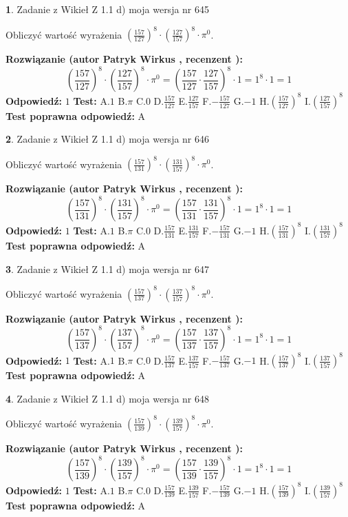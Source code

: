 \documentclass[12pt, a4paper]{article}
\theoremstyle{definition} %
\newtheorem{zad}{}
\newcommand{\zadStart}[1]{\begin{zad}#1\newline}
\newcommand{\zadStop}{\end{zad}}
\newcommand{\rozwStart}[2]{\noindent \textbf{Rozwiązanie (autor #1 , recenzent #2): }\newline}
\newcommand{\rozwStop}{\newline}
\newcommand{\odpStart}{\noindent \textbf{Odpowiedź:}\newline}
\newcommand{\odpStop}{\newline}
\newcommand{\testStart}{\noindent \textbf{Test:}\newline}
\newcommand{\testStop}{\newline}
\newcommand{\kluczStart}{\noindent \textbf{Test poprawna odpowiedź:}\newline}
\newcommand{\kluczStop}{\newline}
\begin{document}
\zadStart{Zadanie z Wikieł Z 1.1 d) moja wersja nr 645}

Obliczyć wartość wyrażenia $(\frac{157}{127})^{8} \cdot (\frac{127}{157})^{8} \cdot \pi^{0}$.
\zadStop
\rozwStart{Patryk Wirkus}{}
$$(\frac{157}{127})^{8} \cdot (\frac{127}{157})^{8} \cdot \pi^{0} = (\frac{157}{127} \cdot \frac{127}{157})^{8} \cdot 1 = 1^{8} \cdot 1 = 1$$
\rozwStop
\odpStart
$1$
\odpStop
\testStart
A.$1$ B.$\pi$ C.$0$ D.$\frac{157}{127}$ E.$\frac{127}{157}$
F.$-\frac{157}{127}$ G.$-1$
H.$(\frac{157}{127})^{8}$
I.$(\frac{127}{157})^{8}$
\testStop
\kluczStart
A
\kluczStop



\zadStart{Zadanie z Wikieł Z 1.1 d) moja wersja nr 646}

Obliczyć wartość wyrażenia $(\frac{157}{131})^{8} \cdot (\frac{131}{157})^{8} \cdot \pi^{0}$.
\zadStop
\rozwStart{Patryk Wirkus}{}
$$(\frac{157}{131})^{8} \cdot (\frac{131}{157})^{8} \cdot \pi^{0} = (\frac{157}{131} \cdot \frac{131}{157})^{8} \cdot 1 = 1^{8} \cdot 1 = 1$$
\rozwStop
\odpStart
$1$
\odpStop
\testStart
A.$1$ B.$\pi$ C.$0$ D.$\frac{157}{131}$ E.$\frac{131}{157}$
F.$-\frac{157}{131}$ G.$-1$
H.$(\frac{157}{131})^{8}$
I.$(\frac{131}{157})^{8}$
\testStop
\kluczStart
A
\kluczStop



\zadStart{Zadanie z Wikieł Z 1.1 d) moja wersja nr 647}

Obliczyć wartość wyrażenia $(\frac{157}{137})^{8} \cdot (\frac{137}{157})^{8} \cdot \pi^{0}$.
\zadStop
\rozwStart{Patryk Wirkus}{}
$$(\frac{157}{137})^{8} \cdot (\frac{137}{157})^{8} \cdot \pi^{0} = (\frac{157}{137} \cdot \frac{137}{157})^{8} \cdot 1 = 1^{8} \cdot 1 = 1$$
\rozwStop
\odpStart
$1$
\odpStop
\testStart
A.$1$ B.$\pi$ C.$0$ D.$\frac{157}{137}$ E.$\frac{137}{157}$
F.$-\frac{157}{137}$ G.$-1$
H.$(\frac{157}{137})^{8}$
I.$(\frac{137}{157})^{8}$
\testStop
\kluczStart
A
\kluczStop



\zadStart{Zadanie z Wikieł Z 1.1 d) moja wersja nr 648}

Obliczyć wartość wyrażenia $(\frac{157}{139})^{8} \cdot (\frac{139}{157})^{8} \cdot \pi^{0}$.
\zadStop
\rozwStart{Patryk Wirkus}{}
$$(\frac{157}{139})^{8} \cdot (\frac{139}{157})^{8} \cdot \pi^{0} = (\frac{157}{139} \cdot \frac{139}{157})^{8} \cdot 1 = 1^{8} \cdot 1 = 1$$
\rozwStop
\odpStart
$1$
\odpStop
\testStart
A.$1$ B.$\pi$ C.$0$ D.$\frac{157}{139}$ E.$\frac{139}{157}$
F.$-\frac{157}{139}$ G.$-1$
H.$(\frac{157}{139})^{8}$
I.$(\frac{139}{157})^{8}$
\testStop
\kluczStart
A
\kluczStop
\end{document}
